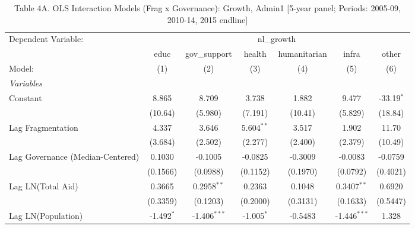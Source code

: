 
\begin{table}[H]
   \caption{Table 4A. OLS Interaction Models (Frag x Governance): Growth, Admin1 [5-year panel; Periods: 2005-09, 2010-14, 2015 endline]}
   \centering
   \begin{tabular}{lcccccc}
      \tabularnewline \midrule \midrule
      Dependent Variable: & \multicolumn{6}{c}{nl\_growth}\\
                                                           & educ         & gov\_support   & health       & humanitarian & infra          & other \\   
      Model:                                               & (1)          & (2)            & (3)          & (4)          & (5)            & (6)\\  
      \midrule
      \emph{Variables}\\
      Constant                                             & 8.865        & 8.709          & 3.738        & 1.882        & 9.477          & -33.19$^{*}$\\   
                                                           & (10.64)      & (5.980)        & (7.191)      & (10.41)      & (5.829)        & (18.84)\\   
      Lag Fragmentation                                    & 4.337        & 3.646          & 5.604$^{**}$ & 3.517        & 1.902          & 11.70\\   
                                                           & (3.684)      & (2.502)        & (2.277)      & (2.400)      & (2.379)        & (10.49)\\   
      Lag Governance (Median-Centered)                     & 0.1030       & -0.1005        & -0.0825      & -0.3009      & -0.0083        & -0.0759\\   
                                                           & (0.1566)     & (0.0988)       & (0.1152)     & (0.1970)     & (0.0792)       & (0.4021)\\   
      Lag LN(Total Aid)                                    & 0.3665       & 0.2958$^{**}$  & 0.2363       & 0.1048       & 0.3407$^{**}$  & 0.6920\\   
                                                           & (0.3359)     & (0.1203)       & (0.2000)     & (0.3131)     & (0.1633)       & (0.5447)\\   
      Lag LN(Population)                                   & -1.492$^{*}$ & -1.406$^{***}$ & -1.005$^{*}$ & -0.5483      & -1.446$^{***}$ & 1.328\\   

\end{tabular}
\end{table}
